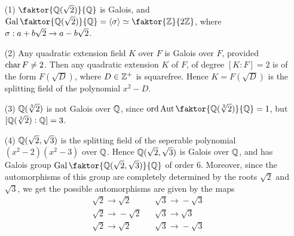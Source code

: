 \begin{example}\label{example_2.3}
    \begin{enumerate}
        \item[(1)] $\faktor{\Q(\sqrt{2})}{\Q}$ is Galois, and
            $\Gal{\faktor{\Q(\sqrt{2})}{\Q}}=\langle \s \rangle \simeq
            \faktor{\Z}{2\Z}$, where $\sigma:a+b\sqrt{2} \xrightarrow{}
            a-b\sqrt{2}$.

        \item[(2)] Any quadratic extension field $K$ over  $F$ is Galois over
            $F$, provided  $\operatorname{char}{F} \neq 2$. Then any quadratic extension $K$
            of  $F$, of degree  $[K:F]=2$ is of the form $F(\sqrt{D})$, where $D
            \in \mathbb{Z}^+$ is squarefree. Hence $K=F(\sqrt{D})$ is the splitting
            field of the polynomial $x^2-D$.

        \item[(3)] $\mathbb{Q}(\sqrt[3]{2})$ is not Galois over $\mathbb{Q}$, since
            $\ord{\Aut{\faktor{\Q(\sqrt[3]{2})}{\Q}}}=1$, but
            $[\mathbb{Q}(\sqrt[3]{2}):\mathbb{Q}]=3$.

        \item[(4)] $\mathbb{Q}(\sqrt{2},\sqrt{3})$ is the splitting field of the
            seperable polynomial $(x^2-2)(x^2-3)$ over $\mathbb{Q}$. Hence
            $\mathbb{Q}(\sqrt{2},\sqrt{3})$ is Galois over $\mathbb{Q}$, and has Galois group
            $\Gal{\faktor{\Q(\sqrt{2},\sqrt{3})}{\Q}}$ of order $6$. Moreover,
            since the automorphisms of this group are completely determined by
            the roots $\sqrt{2}$ and $\sqrt{3}$, we get the possible
            automorphisms are given by the maps
            \begin{equation*}
                \begin{array}{lcl}
                    \sqrt{2}    \xrightarrow{} \sqrt{2} && \sqrt{3}
                                                \xrightarrow{} -\sqrt{3} \\

                 \sqrt{2}    \xrightarrow{} -\sqrt{2} && \sqrt{3}
                                            \xrightarrow{} \sqrt{3} \\

                    \sqrt{2}    \xrightarrow{} \sqrt{2} && \sqrt{3}
                                                \xrightarrow{} -\sqrt{3} \\


\end{array}
\end{equation*}
\end{enumerate}
\end{example}
